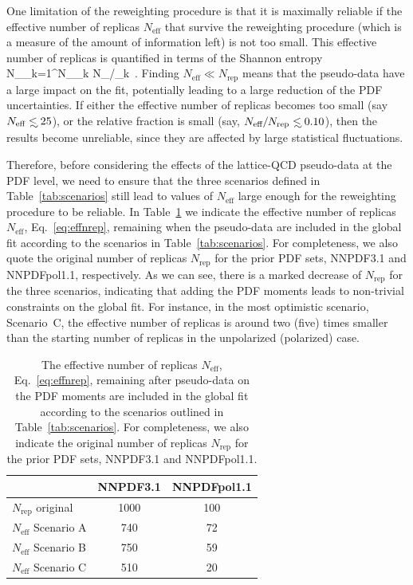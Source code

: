 One limitation of the reweighting procedure is that it is maximally 
reliable if the effective number of replicas $N_\text{eff}$ that survive the 
reweighting procedure (which is a measure of the amount
of information left) is not too small.
%
This effective number of replicas is quantified in terms of the Shannon 
entropy~\cite{Ball:2011gg,Ball:2010gb}
\be
\label{eq:effnrep}
N_\equiv \exp\lc {}\sum_{k=1}^{N_}\omega_k
\log \lp N_/\omega_k\rp\rc \, .
\ee
%
Finding $N_\text{eff}\ll N_\text{rep}$ means that the pseudo-data
have a large impact on the fit, potentially leading to a large
reduction of the PDF uncertainties.
%
If either the effective number of replicas becomes too small 
(say $N_\text{eff}\lsim 25$), or the relative fraction is small 
(say, $N_\text{eff}/N_\text{rep}\lsim 0.10$), then the results become unreliable, 
since they are affected by large statistical fluctuations.

Therefore, before considering the effects
of the lattice-QCD pseudo-data at the PDF
level, we need to ensure that the
three scenarios defined
in Table~\ref{tab:scenarios} still lead
to values of $N_\text{eff}$ large enough for
the reweighting procedure to be reliable.
%
In Table~\ref{tab:neff} we indicate the effective number of replicas
$N_\text{eff}$, Eq.~\eqref{eq:effnrep}, remaining when the pseudo-data
are included in the global
fit according to the scenarios in Table~\ref{tab:scenarios}.
%
For completeness, we also quote the original number
of replicas $N_\text{rep}$ for the prior
PDF sets, NNPDF3.1 and NNPDFpol1.1, respectively.
%
As we can see, there is a marked decrease of $N_\text{rep}$
for the three scenarios, indicating that adding the
PDF moments leads to non-trivial constraints on the global fit.
%
For instance, in the most optimistic scenario, Scenario~C, the effective 
number of replicas is around two (five) times smaller than the starting 
number of replicas in the unpolarized (polarized) case.

\begin{table}[!t]
\centering
\footnotesize
\renewcommand{\arraystretch}{1.3} 
\begin{tabular}{lcc}
\toprule
&  NNPDF3.1  &  NNPDFpol1.1 \\
\midrule
$N_\text{rep}$ original   &   1000 &  100   \\
$N_\text{eff}$ Scenario A    &   740  &  72   \\
$N_\text{eff}$ Scenario B    &   750   &   59  \\
$N_\text{eff}$ Scenario C   &   510  &   20  \\
\bottomrule
\end{tabular}
\caption{\small The effective number of replicas
$N_\text{eff}$, Eq.~\eqref{eq:effnrep}, remaining after pseudo-data
on the PDF moments are included in the global
fit according to the scenarios outlined
in Table~\ref{tab:scenarios}.
%
For completeness, we also indicate the original number
of replicas $N_\text{rep}$ for the prior
PDF sets, NNPDF3.1 and NNPDFpol1.1.
\label{tab:neff}}
\end{table}

